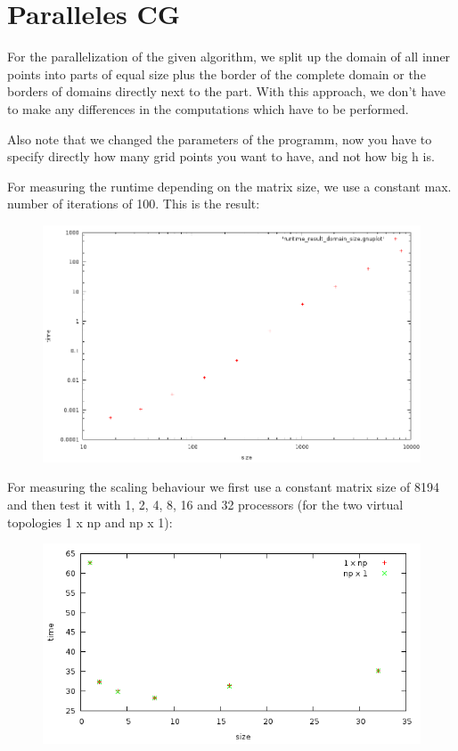 \documentclass[a4paper,10pt]{article}
\begin{document}
\section{Paralleles CG}
For the parallelization of the given algorithm, we split up the domain of all inner points into parts of equal size plus the border of the complete domain or the borders of domains directly next to the part. With this approach, we don't have to make any differences in the computations which have to be performed. 

Also note that we changed the parameters of the programm, now you have to specify directly how many grid points you want to have, and not how big h is.

For measuring the runtime depending on the matrix size, we use a constant max. number of iterations of 100.
This is the result:
\begin{figure}[h!]
 \centering
 \includegraphics[width=1.0 \textwidth]{10/runtime_domain_size.png}
\end{figure}


For measuring the scaling behaviour we first use a constant matrix size of 8194 and then test it with 1, 2, 4, 8, 16 and 32 processors (for the two virtual topologies 1 x np and np x 1):
\begin{figure}[h!]
 \centering
 \includegraphics[width=1.0\textwidth]{10/runtime_scaling.png}
\end{figure}
\end{document}
